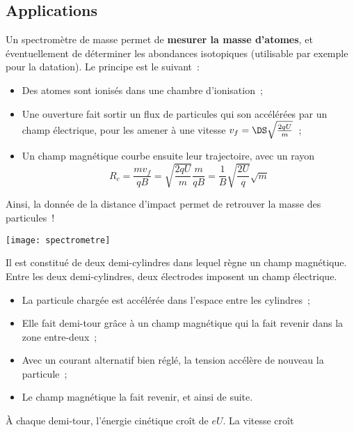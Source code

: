 \documentclass[../main/main.tex]{subfiles}
\begin{document}
\subsection{Applications}
\begin{itemize}[label=$\diamond$]
     Un spectromètre de masse permet de
        \textbf{mesurer la masse d'atomes}, et éventuellement de déterminer les
        abondances isotopiques (utilisable par exemple pour la datation). Le
        principe est le suivant~:
        \begin{itemize}
            \item Des atomes sont ionisés dans une chambre d'ionisation~;
            \item Une ouverture fait sortir un flux de particules qui son
                accélérées par un champ électrique, pour les amener à une
                vitesse $v_f = \DS \sqrt{\frac{2qU}{m}}$~;
            \item Un champ magnétique courbe ensuite leur trajectoire, avec un
                rayon
                \[R_c = \frac{mv_f}{qB} = \sqrt{\frac{2qU}{m}}\frac{m}{qB} =
                \frac{1}{B} \sqrt{\frac{2U}{q}}\sqrt{m}\]
        \end{itemize}
        Ainsi, la donnée de la distance d'impact permet de retrouver la masse
        des particules~! \bigbreak
        \begin{center}
            \texttt{[image: spectrometre]}
            \label{fig:spectrometre}
        \end{center}
     Il est constitué de deux demi-cylindres dans lequel
        règne un champ magnétique. Entre les deux demi-cylindres, deux
        électrodes imposent un champ électrique.
        \begin{itemize}
            \item La particule chargée est accélérée dans l'espace entre les
                cylindres~;
            \item Elle fait demi-tour grâce à un champ magnétique qui la fait
                revenir dans la zone entre-deux~;
            \item Avec un courant alternatif bien réglé, la tension accélère de
                nouveau la particule~;
            \item Le champ magnétique la fait revenir, et ainsi de suite.
        \end{itemize}
        À chaque demi-tour, l'énergie cinétique croît de $eU$. La vitesse croît

\end{itemize}
\end{document}
